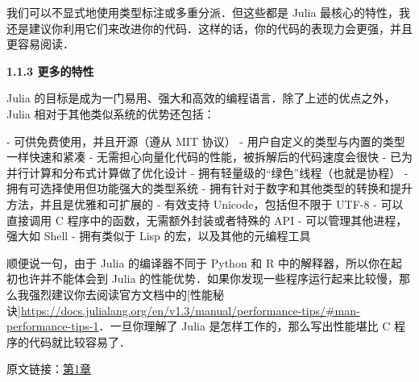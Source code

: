我们可以不显式地使用类型标注或多重分派．但这些都是 Julia 最核心的特性，我还是建议你利用它们来改进你的代码．这样的话，你的代码的表现力会更强，并且更容易阅读．

\textbf{1.1.3 更多的特性}

Julia 的目标是成为一门易用、强大和高效的编程语言．除了上述的优点之外，Julia 相对于其他类似系统的优势还包括：

- 可供免费使用，并且开源（遵从 MIT 协议）
- 用户自定义的类型与内置的类型一样快速和紧凑
- 无需担心向量化代码的性能，被拆解后的代码速度会很快
- 已为并行计算和分布式计算做了优化设计
- 拥有轻量级的“绿色”线程（也就是协程）
- 拥有可选择使用但功能强大的类型系统
- 拥有针对于数字和其他类型的转换和提升方法，并且是优雅和可扩展的
- 有效支持 Unicode，包括但不限于 UTF-8
- 可以直接调用 C 程序中的函数，无需额外封装或者特殊的 API
- 可以管理其他进程，强大如 Shell
- 拥有类似于 Lisp 的宏，以及其他的元编程工具

顺便说一句，由于 Julia 的编译器不同于 Python 和 R 中的解释器，所以你在起初也许并不能体会到 Julia 的性能优势．如果你发现一些程序运行起来比较慢，那么我强烈建议你去阅读官方文档中的[性能秘诀]\href{https://docs.julialang.org/en/v1.3/manual/performance-tips/#man-performance-tips-1}{https://docs.julialang.org/en/v1.3/manual/performance-tips/#man-performance-tips-1}．一旦你理解了 Julia 是怎样工作的，那么写出性能堪比 C 程序的代码就比较容易了．


原文链接：\href{https://github.com/hyper0x/JuliaBasics/blob/master/book/ch01.md}{第1章}